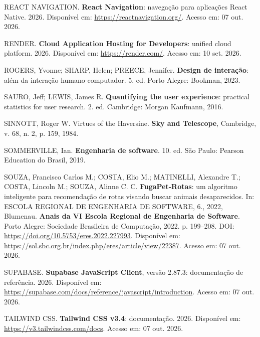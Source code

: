\begin{flushleft}
\vspace{12pt}
\noindent REACT NAVIGATION. \textbf{React Navigation}: navegação para aplicações React Native. 2026. Disponível em: \url{https://reactnavigation.org/}. Acesso em: 07 out. 2026.

\vspace{12pt}
\noindent RENDER. \textbf{Cloud Application Hosting for Developers}: unified cloud platform. 2026. Disponível em: \url{https://render.com/}. Acesso em: 10 set. 2026.

\vspace{12pt}
\noindent ROGERS, Yvonne; SHARP, Helen; PREECE, Jennifer. \textbf{Design de interação}: além da interação humano-computador. 5. ed. Porto Alegre: Bookman, 2023.

\vspace{12pt}
\noindent SAURO, Jeff; LEWIS, James R. \textbf{Quantifying the user experience}: practical statistics for user research. 2. ed. Cambridge: Morgan Kaufmann, 2016.

\vspace{12pt}
\noindent SINNOTT, Roger W. Virtues of the Haversine. \textbf{Sky and Telescope}, Cambridge, v. 68, n. 2, p. 159, 1984.

\vspace{12pt}
\noindent SOMMERVILLE, Ian. \textbf{Engenharia de software}. 10. ed. São Paulo: Pearson Education do Brasil, 2019.

\vspace{12pt}
\noindent SOUZA, Francisco Carlos M.; COSTA, Elio M.; MATINELLI, Alexandre T.; COSTA, Lincoln M.; SOUZA, Alinne C. C. \textbf{FugaPet-Rotas}: um algoritmo inteligente para recomendação de rotas visando buscar animais desaparecidos. In: ESCOLA REGIONAL DE ENGENHARIA DE SOFTWARE, 6., 2022, Blumenau. \textbf{Anais da VI Escola Regional de Engenharia de Software}. Porto Alegre: Sociedade Brasileira de Computação, 2022. p. 199--208. DOI: \url{https://doi.org/10.5753/eres.2022.227993}. Disponível em: \url{https://sol.sbc.org.br/index.php/eres/article/view/22387}. Acesso em: 07 out. 2026.

\vspace{12pt}
\noindent SUPABASE. \textbf{Supabase JavaScript Client}, versão 2.87.3: documentação de referência. 2026. Disponível em: \url{https://supabase.com/docs/reference/javascript/introduction}. Acesso em: 07 out. 2026.

\vspace{12pt}
\noindent TAILWIND CSS. \textbf{Tailwind CSS v3.4}: documentação. 2026. Disponível em: \url{https://v3.tailwindcss.com/docs}. Acesso em: 07 out. 2026.


\end{flushleft}
